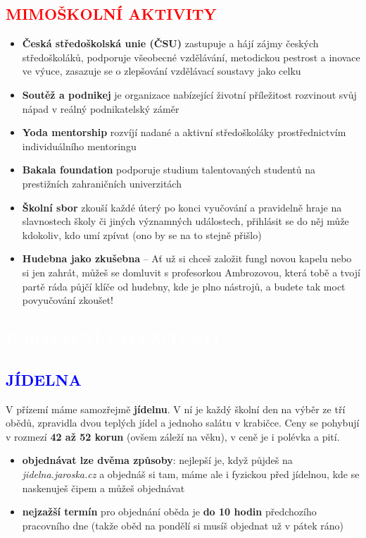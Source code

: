 \documentclass[a5paper, twoside]{article}
\newcommand{\nadpis}[4]{
  \vspace*{-50pt}
  \begin{tcolorbox}[colback = #2, boxrule = 0pt, grow to left by = #4,  grow to right by = #4, arc=8pt, height = 40pt]
    \vspace*{5pt}
    \centering \section*{\textcolor{#3}{#1}}
  \end{tcolorbox}
}
\newcommand{\podnadpis}[2]{
  \subsection*{\textcolor{#2}{#1}}
}
\begin{document}
\podnadpis{MIMOŠKOLNÍ AKTIVITY}{red}
\begin{itemize}[leftmargin=10pt]
	\item \textbf{Česká středoškolská unie (ČSU)} zastupuje a hájí zájmy českých středoškoláků, podporuje všeobecné vzdělávání, metodickou pestrost a inovace ve výuce, zasazuje se o zlepšování vzdělávací soustavy jako celku
	\item \textbf{Soutěž a podnikej} je organizace nabízející životní příležitost rozvinout svůj nápad v reálný podnikatelský záměr
	\item \textbf{Yoda mentorship} rozvíjí nadané a aktivní středoškoláky prostřednictvím individuálního mentoringu
	\item \textbf{Bakala foundation} podporuje studium talentovaných studentů na prestižních zahraničních univerzitách
	\item \textbf{Školní sbor} zkouší každé úterý po konci vyučování a pravidelně hraje na slavnostech školy či jiných významných událostech, přihlásit se do něj může kdokoliv, kdo umí zpívat (ono by se na to stejně přišlo)
	\item \textbf{Hudebna jako zkušebna} -- Ať už si chceš založit fungl novou kapelu nebo si jen zahrát, můžeš se domluvit s profesorkou Ambrozovou, která tobě a tvojí partě ráda půjčí klíče od hudebny, kde je plno nástrojů, a budete tak moct povyučování zkoušet!
\end{itemize}

\newpage

\nadpis{FORMÁLNÍ ZÁLEŽITOSTI}{blue}{white}{-2.5cm}

\noindent \podnadpis{JÍDELNA}{blue}
V přízemí máme samozřejmě \textbf{jídelnu}. V ní je každý školní den na výběr ze tří obědů, zpravidla dvou teplých jídel a jednoho salátu v krabičce. Ceny se pohybují v rozmezí \textbf{42 až 52 korun} (ovšem záleží na věku), v ceně je i polévka a pití.

\begin{itemize}[leftmargin=10pt]
	\item \textbf{objednávat lze dvěma způsoby}: nejlepší je, když půjdeš na \textit{jidelna.jaroska.cz} a objednáš si tam, máme ale i fyzickou  před jídelnou, kde se naskenuješ čipem a můžeš objednávat
	\item \textbf{nejzažší termín} pro objednání oběda je \textbf{do 10 hodin} předchozího pracovního dne (takže oběd na pondělí si musíš objednat už v pátek ráno)
\end{itemize}
\end{document}
